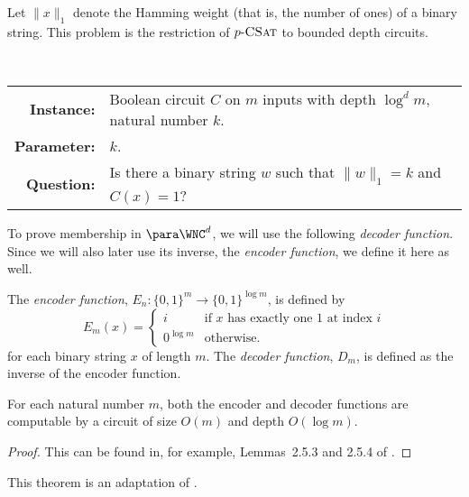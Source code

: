 Let $\|x\|_1$ denote the Hamming weight (that is, the number of ones) of a binary string.
This problem is the restriction of $p \textnormal{-} \textsc{CSat}$ to bounded depth circuits.

\begin{definition}[$\pNCSAT$]
  \mbox{} \\
  \begin{tabular}{r p{9.2cm}}
    \textbf{Instance:} & Boolean circuit $C$ on $m$ inputs with depth $\log^d m$, natural number $k$. \\
    \textbf{Parameter:} & $k$. \\
    \textbf{Question:} & Is there a binary string $w$ such that $\|w\|_1 = k$ and $C(x) = 1$?
  \end{tabular}
\end{definition}

To prove membership in $\para \WNC^d$, we will use the following \emph{decoder function}.
Since we will also later use its inverse, the \emph{encoder function}, we define it here as well.

\begin{definition}\label{def:coding}
  The \emph{encoder function}, $E_n \colon \{0, 1\}^m \to \{0, 1\}^{\log m}$, is defined by
  \[
  E_m(x) =
  \begin{cases}
    i & \text{if } x \text{ has exactly one 1 at index } i \\
    0^{\log m} & \text{otherwise}.
  \end{cases}
  \]
  for each binary string $x$ of length $m$.
  The \emph{decoder function}, $D_m$, is defined as the inverse of the encoder function.
\end{definition}

\begin{lemma}\label{lem:codingbounds}
  For each natural number $m$, both the encoder and decoder functions are computable by a circuit of size $O(m)$ and depth $O(\log m)$.
\end{lemma}
\begin{proof}
  This can be found in, for example, Lemmas~2.5.3 and 2.5.4 of \autocite{savage98}.
\end{proof}

This theorem is an adaptation of \autocite[Lemma~3.3]{cc97lim}.

